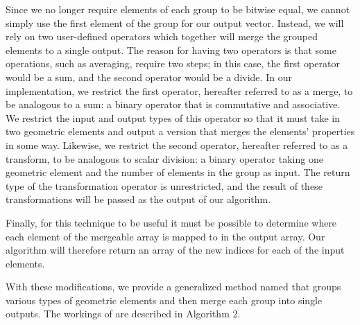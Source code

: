 \documentclass[10pt,journal,cspaper,compsoc]{IEEEtran}
\begin{document}
Since we no longer require elements of each group to be bitwise
equal, we cannot simply use the first element of the group for our output vector. Instead, we will rely on two user-defined operators
which together will merge the grouped elements to a single output. The reason for having two operators is that some operations, such
as averaging, require two steps; in this case, the first operator would be a sum, and the second operator would be a divide. In our
implementation, we restrict the first operator, hereafter referred to as a merge, to be analogous to a sum: a binary operator that is commutative and associative. We restrict the input and output types of this operator so that it must take in two geometric elements and output a version that merges the elements' properties in some way.
Likewise, we restrict the second operator, hereafter referred to as a transform, to be analogous to scalar division: a binary operator taking one geometric element and the number of elements in the
group as input. The return type of the transformation operator is unrestricted, and the result of these transformations will be passed as the output of our algorithm. 

Finally, for this technique to be useful it must be possible to determine where each element of the mergeable array is mapped to in the output array. 
Our algorithm will therefore return an array of the new indices for each of the input elements.


With these modifications, we provide a generalized method named  that groups various 
types of geometric elements and then merge each group into single outputs. The workings of  are described in Algorithm 2.
\end{document}
